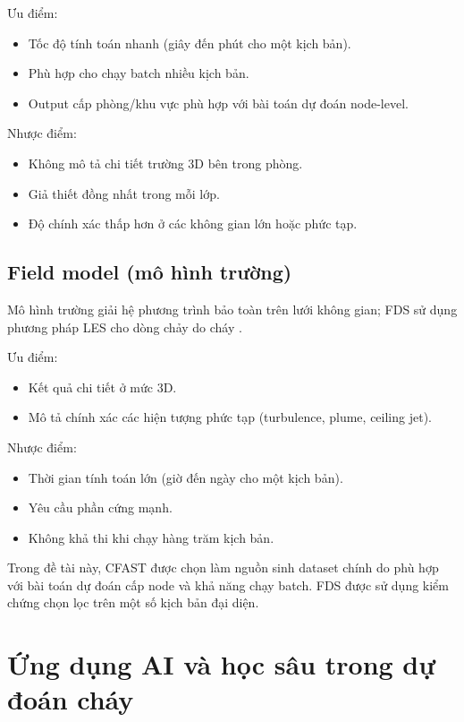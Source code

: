 Ưu điểm:
\begin{itemize}
  \item Tốc độ tính toán nhanh (giây đến phút cho một kịch bản).
  \item Phù hợp cho chạy batch nhiều kịch bản.
  \item Output cấp phòng/khu vực phù hợp với bài toán dự đoán node-level.
\end{itemize}

Nhược điểm:
\begin{itemize}
  \item Không mô tả chi tiết trường 3D bên trong phòng.
  \item Giả thiết đồng nhất trong mỗi lớp.
  \item Độ chính xác thấp hơn ở các không gian lớn hoặc phức tạp.
\end{itemize}

\subsection{Field model (mô hình trường)}

Mô hình trường giải hệ phương trình bảo toàn trên lưới không gian; FDS sử dụng phương pháp LES cho dòng chảy do cháy \cite{fds_guide,fds_tech}.

Ưu điểm:
\begin{itemize}
  \item Kết quả chi tiết ở mức 3D.
  \item Mô tả chính xác các hiện tượng phức tạp (turbulence, plume, ceiling jet).
\end{itemize}

Nhược điểm:
\begin{itemize}
  \item Thời gian tính toán lớn (giờ đến ngày cho một kịch bản).
  \item Yêu cầu phần cứng mạnh.
  \item Không khả thi khi chạy hàng trăm kịch bản.
\end{itemize}

Trong đề tài này, CFAST được chọn làm nguồn sinh dataset chính do phù hợp với bài toán dự đoán cấp node và khả năng chạy batch. FDS được sử dụng kiểm chứng chọn lọc trên một số kịch bản đại diện.

\section{Ứng dụng AI và học sâu trong dự đoán cháy}
\label{sec:aidlfire}

